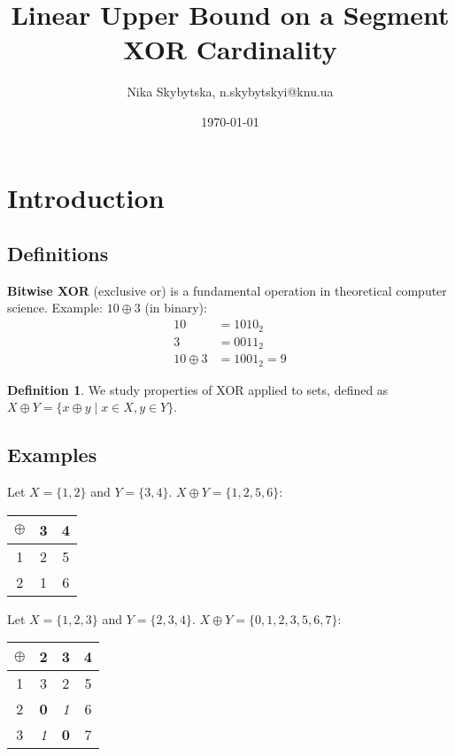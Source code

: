 \documentclass[handout,notheorems]{beamer}
\institute[KNU]{Taras Shevchenko National University of Kyiv}
\author[Skybytska N.]{Nika Skybytska, n.skybytskyi@knu.ua}
\title[Linear Upper Bound on Segment XOR]{Linear Upper Bound on a Segment XOR Cardinality}
\date{\today}
\theoremstyle{definition}
\newtheorem*{definition}{Definition}
\begin{document}
\begin{frame}
    \titlepage
\end{frame}

\section{Introduction}

\subsection{Definitions}

\begin{frame}
    \textbf{Bitwise XOR} (exclusive or) is a fundamental operation in theoretical computer science. Example: $10 \oplus 3$ (in binary):
    \begin{equation*}
        \begin{array}{rl}
            10 &= 1010_2 \\
             3 &= 0011_2 \\
            \hline
            10 \oplus 3 &= 1001_2 = 9
        \end{array}
    \end{equation*}
    \pause
    \begin{definition}
        We study properties of XOR applied to sets, defined as $X \oplus Y = \{ x \oplus y \mid x \in X, y \in Y \}$.
    \end{definition}
\end{frame}

\subsection{Examples}

\begin{frame}
    Let $X = \{1, 2\}$ and $Y = \{3, 4\}$. $X \oplus Y = \{1, 2, 5, 6\}$:
    \begin{table}
        \begin{tabular}{c|cc}
            $\oplus$ & 3 & 4 \\ \hline
            1 & 2 & 5 \\
            2 & 1 & 6 \\
        \end{tabular}
    \end{table}
    \pause
    Let $X = \{1, 2, 3\}$ and $Y = \{2, 3, 4\}$. $X \oplus Y = \{0, 1, 2, 3, 5, 6, 7\}$:
    \begin{table}
        \begin{tabular}{c|ccc}
            $\oplus$ & 2 & 3 & 4 \\ \hline
            1 & 3 & 2 & 5 \\
            2 & \textbf{0} & \textit{1} & 6 \\
            3 & \textit{1} & \textbf{0} & 7 
        \end{tabular}
    \end{table}
\end{frame}
\end{document}
